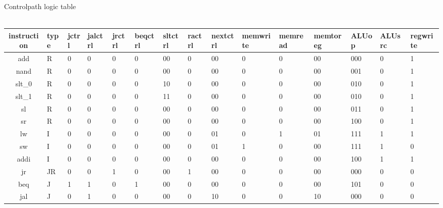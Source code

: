 \documentclass[9pt,letterpaper]{article}
\begin{document}
\begin{landscape}

\centering
Controlpath logic table\\
\ \\
\begin{center}
\begin{tabular}{|cllllllllllllll|}
\hline
instruction & type & jctrl & jalctrl & jrctrl & beqctrl & sltctrl & ractrl & nextctrl & memwrite & memread & memtoreg & ALUop & ALUsrc & regwrite \\

\hline 
add    & R & 0 & 0 & 0 & 0 & 00 & 0 & 00 & 0 & 0 & 00 & 000 & 0 & 1\\
nand   & R & 0 & 0 & 0 & 0 & 00 & 0 & 00 & 0 & 0 & 00 & 001 & 0 & 1\\
slt\_0 & R & 0 & 0 & 0 & 0 & 10 & 0 & 00 & 0 & 0 & 00 & 010 & 0 & 1\\
slt\_1 & R & 0 & 0 & 0 & 0 & 11 & 0 & 00 & 0 & 0 & 00 & 010 & 0 & 1\\
sl     & R & 0 & 0 & 0 & 0 & 00 & 0 & 00 & 0 & 0 & 00 & 011 & 0 & 1\\
sr     & R & 0 & 0 & 0 & 0 & 00 & 0 & 00 & 0 & 0 & 00 & 100 & 0 & 1\\
lw     & I & 0 & 0 & 0 & 0 & 00 & 0 & 01 & 0 & 1 & 01 & 111 & 1 & 1\\
sw     & I & 0 & 0 & 0 & 0 & 00 & 0 & 01 & 1 & 0 & 00 & 111 & 1 & 0\\
addi   & I & 0 & 0 & 0 & 0 & 00 & 0 & 00 & 0 & 0 & 00 & 100 & 1 & 1\\
jr     &JR & 0 & 0 & 1 & 0 & 00 & 1 & 00 & 0 & 0 & 00 & 000 & 0 & 0\\
beq    & J & 1 & 1 & 0 & 1 & 00 & 0 & 00 & 0 & 0 & 00 & 101 & 0 & 0\\
jal    & J & 0 & 1 & 0 & 0 & 00 & 0 & 10 & 0 & 0 & 10 & 000 & 0 & 0\\


\hline 
\end{tabular}
\end{center}
\end{landscape}
\end{document}
